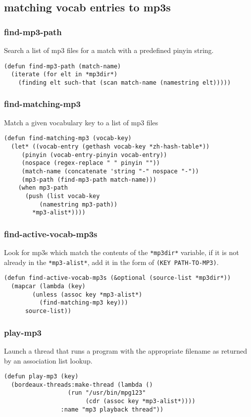 \documentclass[11pt]{article}
\begin{document}
\subsection{matching vocab entries to mp3s}
\label{sec-7-2}
\subsubsection*{find-mp3-path}
\label{sec-7-2-1}
Search a list of mp3 files for a match with a predefined pinyin string.
\begin{verbatim}
(defun find-mp3-path (match-name)
  (iterate (for elt in *mp3dir*)
    (finding elt such-that (scan match-name (namestring elt)))))
\end{verbatim}
\subsubsection*{find-matching-mp3}
\label{sec-7-2-2}
Match a given vocabulary key to a list of mp3 files
\begin{verbatim}
(defun find-matching-mp3 (vocab-key)
  (let* ((vocab-entry (gethash vocab-key *zh-hash-table*))
	 (pinyin (vocab-entry-pinyin vocab-entry))
	 (nospace (regex-replace " " pinyin ""))
	 (match-name (concatenate 'string "-" nospace "-"))
	 (mp3-path (find-mp3-path match-name)))
    (when mp3-path
      (push (list vocab-key
		  (namestring mp3-path))
	    *mp3-alist*))))
\end{verbatim}
\subsubsection*{find-active-vocab-mp3s}
\label{sec-7-2-3}
Look for mp3s which match the contents of the \texttt{*mp3dir*} variable, if it is not
already in the \texttt{*mp3-alist*}, add it in the form of \texttt{(KEY PATH-TO-MP3)}.
\begin{verbatim}
(defun find-active-vocab-mp3s (&optional (source-list *mp3dir*))
  (mapcar (lambda (key)
	    (unless (assoc key *mp3-alist*)
	      (find-matching-mp3 key)))
	  source-list))
\end{verbatim}
\subsubsection*{play-mp3}
\label{sec-7-2-4}
Launch a thread that runs a program with the appropriate filename as returned by
an association list lookup.
\begin{verbatim}
(defun play-mp3 (key)
  (bordeaux-threads:make-thread (lambda ()
				  (run "/usr/bin/mpg123"
				       (cdr (assoc key *mp3-alist*))))
				:name "mp3 playback thread"))
\end{verbatim}
\end{document}
